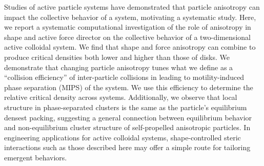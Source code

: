 

Studies of active particle systems have demonstrated that particle anisotropy can impact the collective behavior of a system, motivating a systematic study.
Here, we report a systematic computational investigation of the role of anisotropy in shape and active force director on the collective behavior of a two-dimensional active colloidal system.
We find that shape and force anisotropy can combine to produce critical densities both lower and higher than those of disks.
We demonstrate that changing particle anisotropy tunes what we define as a  ``collision efficiency'' of inter-particle collisions in leading to motility-induced phase separation (MIPS) of the system.
We use this efficiency to determine the relative critical density across systems.
Additionally, we observe that local structure in phase-separated clusters is the same as the particle's equilibrium densest packing, suggesting a general connection between equilibrium behavior and non-equilibrium cluster structure of self-propelled anisotropic particles.
In engineering applications for active colloidal systems, shape-controlled steric interactions such as those described here may offer a simple route for tailoring emergent behaviors.

